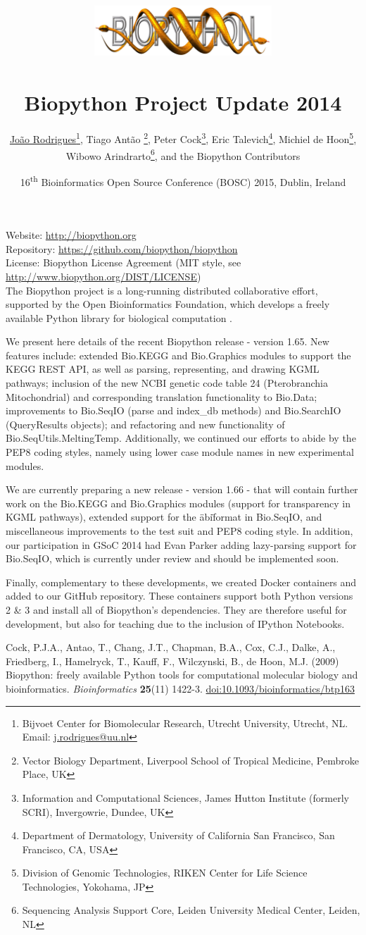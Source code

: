\documentclass[10pt,oneside]{article}
\title{%
\vspace{-1.5in}
\includegraphics[width=0.5\textwidth]{biopython.jpg}\\
~\\Biopython Project Update 2014}
\author{
    \underline{Jo\~{a}o Rodrigues}\footnote{Bijvoet Center for Biomolecular Research, Utrecht University, Utrecht, NL. Email: \href{mailto:j.rodrigues@uu.nl}{j.rodrigues@uu.nl}},
    Tiago Ant\~{a}o \footnote{Vector Biology Department, Liverpool School of Tropical Medicine, Pembroke Place, UK},
    Peter Cock\footnote{Information and Computational Sciences, James Hutton Institute (formerly SCRI), Invergowrie, Dundee, UK},
    Eric Talevich\footnote{Department of Dermatology, University of California San Francisco, San Francisco, CA, USA},
    Michiel de Hoon\footnote{Division of Genomic Technologies, RIKEN Center for Life Science Technologies, Yokohama, JP},
		\\
    Wibowo Arindrarto\footnote{Sequencing Analysis Support Core, Leiden University Medical Center, Leiden, NL},
    and the Biopython Contributors}
\date{16\textsuperscript{th} Bioinformatics Open Source Conference (BOSC) 2015, Dublin, Ireland}
\begin{document}
\maketitle
\thispagestyle{empty}

\vspace{-0.2in}
\noindent
Website: \url{http://biopython.org} \\
Repository: \url{https://github.com/biopython/biopython} \\
License: Biopython License Agreement (MIT style, see \url{http://www.biopython.org/DIST/LICENSE}) \\

The Biopython project is a long-running distributed collaborative effort, 
supported by the Open Bioinformatics Foundation, which develops a freely 
available Python library for biological computation \cite{AppNote}.

We present here details of the recent Biopython release - version 1.65. New 
features include: extended Bio.KEGG and Bio.Graphics modules to support the 
KEGG REST API, as well as parsing, representing, and drawing KGML pathways; 
inclusion of the new NCBI genetic code table 24 (Pterobranchia Mitochondrial) 
and corresponding translation functionality to Bio.Data; improvements to 
Bio.SeqIO (parse and index\_db methods) and Bio.SearchIO (QueryResults objects); 
and refactoring and new functionality of Bio.SeqUtils.MeltingTemp. 
Additionally, we continued our efforts to abide by the PEP8 coding styles, 
namely using lower case module names in new experimental modules.

We are currently preparing a new release - version 1.66 - that will contain 
further work on the Bio.KEGG and Bio.Graphics modules (support for transparency 
in KGML pathways), extended support for the \"abi\" format in Bio.SeqIO, and 
miscellaneous improvements to the test suit and PEP8 coding style. In addition, 
our participation in GSoC 2014 had Evan Parker adding lazy-parsing support for 
Bio.SeqIO, which is currently under review and should be implemented soon.

Finally, complementary to these developments, we created Docker containers and 
added to our GitHub repository. These containers support both Python versions 2 
\& 3 and install all of Biopython's dependencies. They are therefore useful for 
development, but also for teaching due to the inclusion of IPython Notebooks.

\begin{thebibliography}{}

Cock, P.J.A., Antao, T., Chang, J.T., Chapman, B.A., Cox, C.J., Dalke, A., Friedberg, I., Hamelryck, T., Kauff, F., Wilczynski, B., de Hoon, M.J. (2009) Biopython: freely available Python tools for computational molecular biology and bioinformatics. {\it Bioinformatics} {\bf 25}(11) 1422-3. \href{http://dx.doi.org/10.1093/bioinformatics/btp163}{doi:10.1093/bioinformatics/btp163}

\end{thebibliography}
\end{document}

